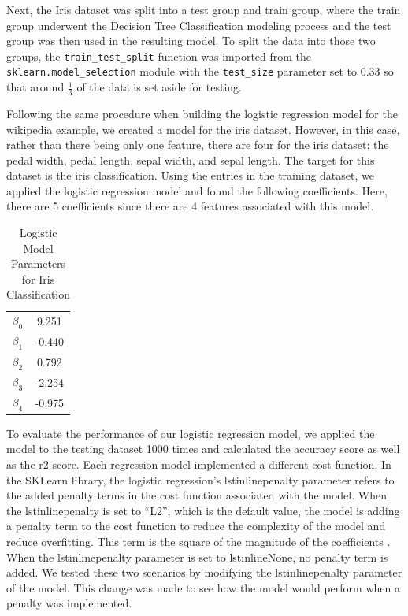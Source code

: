 \documentclass[journal]{IEEEtran}
\begin{document}
Next, the Iris dataset was split into a test group and train group, where the train group underwent the Decision Tree Classification modeling process and the test group was then used in the resulting model. To split the data into those two groups, the \lstinline{train_test_split} function was imported from the \lstinline{sklearn.model_selection} module with the \lstinline{test_size} parameter set to 0.33 so that around \(\frac{1}{3}\) of the data is set aside for testing.

Following the same procedure when building the logistic regression model for the wikipedia example, we created a model for the iris dataset. However, in this case, rather than there being only one feature, there are four for the iris dataset: the pedal width, pedal length, sepal width, and sepal length. The target for this dataset is the iris classification. Using the entries in the training dataset, we applied the logistic regression model and found the following coefficients. Here, there are 5 coefficients since there are 4 features associated with this model. 

\begin{table}[h!]
    \centering
    \begin{tabular}{c c}
        $\beta_0$ &  9.251 \\
        $\beta_1$ &  -0.440 \\
        $\beta_2$ &  0.792 \\
        $\beta_3$ &  -2.254 \\
        $\beta_4$ &  -0.975 
    \end{tabular}    
    \caption{Logistic Model Parameters for Iris Classification}
    \end{table}

To evaluate the performance of our logistic regression model, we applied the model to the testing dataset 1000 times and calculated the accuracy score as well as the r2 score. Each regression model implemented a different cost function. In the SKLearn library, the logistic regression's lstinline{penalty} parameter refers to the added penalty terms in the cost function associated with the model. When the lstinline{penalty} is set to “L2”, which is the default value, the model is adding a penalty term to the cost function to reduce the complexity of the model and reduce overfitting. This term is the square of the magnitude of the coefficients \cite{b4}. When the lstinline{penalty} parameter is set to lstinline{None}, no penalty term is added. We tested these two scenarios by  modifying the lstinline{penalty} parameter of the model. This change was made to see how the model would perform when a penalty was implemented. 
\end{document}
